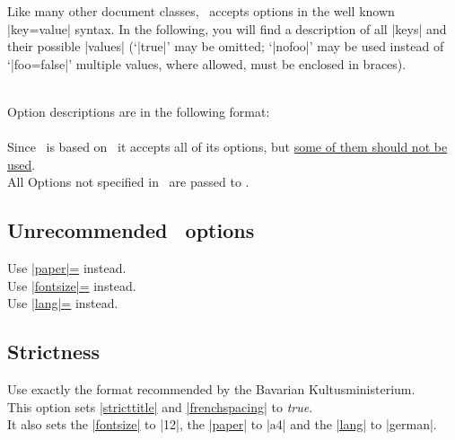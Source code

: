Like many other  document classes, \wsemclassic\ accepts options in
the well known |key=value| syntax. In the following, you will find a
description of all |keys| and their possible |values|
(`|true|' may be omitted; `|nofoo|' may be used instead of `|foo=false|' multiple
values, where allowed, must be enclosed in braces).

\noindent\\ Option descriptions are in the following format:\\

 \\


\noindent
Since \wsemclassic\ is based on \report\ it accepts all of its options, but
\hyperlink{subsubsec.unrecomm}{some of them should not be used}.\\

\noindent
All Options not specified in \wsemclassic\ are passed to \report.

\hypertarget{subsubsec.unrecomm}{\subsection{Unrecommended \report\ options}}

 Use \hyperlink{udoc.opt.paper}{|paper|=} instead. \\
 Use \hyperlink{udoc.opt.fontsize}{|fontsize|=} instead. \\
 Use \hyperlink{udoc.opt.lang}{|lang|=} instead.


\subsection{Strictness}

Use exactly the format recommended by the Bavarian Kultusministerium. \\
This option sets \hyperlink{udoc.opt.stricttitle}{|stricttitle|} and
\hyperlink{udoc.opt.frenchspacing}{|frenchspacing|} to \textit{true}. \\
It also sets the \hyperlink{udoc.opt.fontsize}{|fontsize|} to |12|, the
\hyperlink{udoc.opt.paper}{|paper|} to |a4| and the
\hyperlink{udoc.opt.lang}{|lang|} to |german|.

